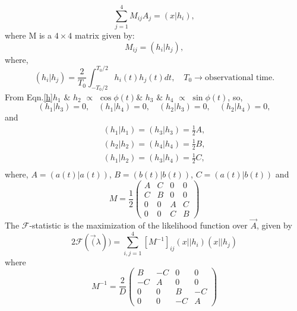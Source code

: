 \documentclass{ttuthes2007}
\begin{document}
\begin{equation}
\sum_{j=1}^4M_{ij}A_j =(x|h_i),
\end{equation}
where M is a $4 \times 4$ matrix given by:
\begin{equation}
M_{ij} = (h_i|h_j),
\end{equation}
where,
\begin{equation}
(h_i|h_j)=\frac{2}{T_0}\int_{-T_0/2}^{T_0/2}h_i(t)h_j(t)dt, \quad
T_0 \rightarrow \text{observational time.}
\end{equation}
From Eqn.\ref{h}\quad $h_1$ $\&$ $h_2$ $\propto$ $\cos{\phi(t)}$\quad \& \quad $h_3$ $\&$ $h_4$
$\propto$ $\sin{\phi(t)}$, so,
\begin{equation}
(h_1|h_3)=0, \quad (h_1|h_4)=0, \quad (h_2|h_3)=0, \quad (h_2|h_4)=0,  
\end{equation}
and
\begin{equation}
\begin{split}
(h_1|h_1)=(h_3|h_3)=\frac{1}{2}A,\\
(h_2|h_2)=(h_4|h_4)=\frac{1}{2}B,\\
(h_1|h_2)=(h_3|h_4)=\frac{1}{2}C,\\
\end{split}
\end{equation}
where, $A=(a(t)|a(t))$, \quad  $B=(b(t)|b(t))$, \quad  $C=(a(t)|b(t))$ and 
\begin{equation*}
M=\frac{1}{2}
\begin{pmatrix}
A & C & 0 & 0\\
C & B & 0 & 0\\
0 & 0 & A & C\\
0 & 0 & C & B
\end{pmatrix}
\end{equation*}
The $\mathcal{F}$-statistic is the maximization of the likelihood function over
$\vec{A}$, given by 
\begin{equation}
2\mathcal{F}(\vec(\lambda))=\sum_{i,j=1}^{4}[M^{-1}]_{ij}(x||h_i)(x||h_j)
\end{equation}
where
\begin{equation*}                                                               
M^{-1}=\frac{2}{D}                                                                   
\begin{pmatrix}                                                                 
B & -C & 0 & 0\\                                                                 
-C & A & 0 & 0\\                                                                 
0 & 0 & B & -C\\                                                                 
0 & 0 & -C & A                                                                   
\end{pmatrix}                                                                   
\end{equation*} 
\end{document}
